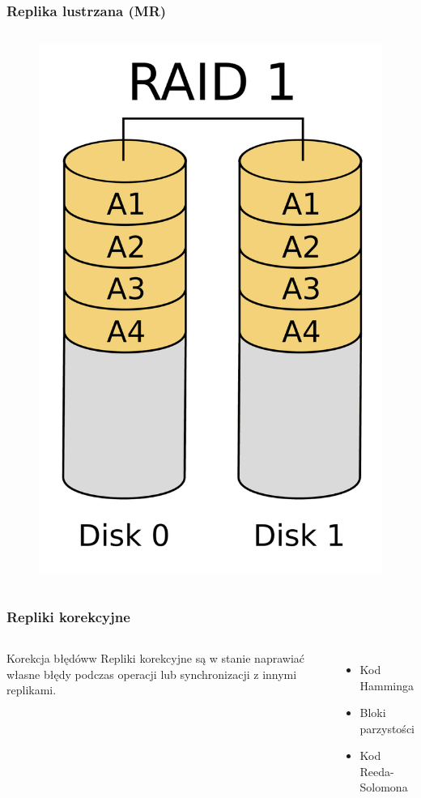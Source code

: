 \documentclass{beamer}
\begin{document}
\begin{frame}
        \frametitle{Replika lustrzana (MR)}
	\begin{columns}
		\begin{figure}
			\includegraphics[]{raid-1.png}
		\end{figure}
	\end{columns}
\end{frame}
	
\begin{frame}
        \frametitle{Repliki korekcyjne }
	\begin{columns}
		\column{1.0\textwidth}
		\begin{block}{Korekcja błędóww}
		   Repliki korekcyjne są w stanie naprawiać własne błędy podczas operacji lub synchronizacji z innymi replikami.
        \end{block}
		\begin{itemize}
			\item Kod Hamminga 
			\item Bloki parzystości
			\item Kod Reeda-Solomona
		\end{itemize}
	\end{columns}
\end{frame}
			
\end{document}
